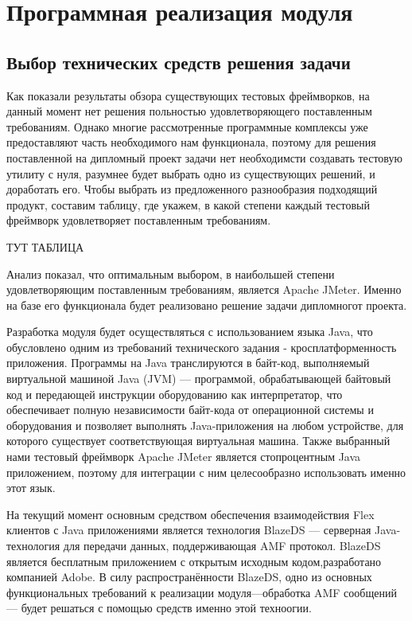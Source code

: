 \chapter{Программная реализация модуля}

\section{Выбор технических средств решения задачи}

 Как показали результаты обзора существующих тестовых фреймворков, на данный момент нет решения польностью
 удовлетворяющего поставленным требованиям. Однако многие рассмотренные программные комплексы уже предоставляют часть
 необходимого нам функционала, поэтому для решения поставленной на дипломный
 проект задачи нет необходимсти создавать тестовую утилиту с нуля, разумнее
 будет выбрать одно из существующих решений, и доработать его.
 Чтобы выбрать из предложенного разнообразия подходящий продукт, составим таблицу, где укажем, в какой степени каждый
  тестовый фреймворк удовлетворяет поставленным требованиям.

  ТУТ ТАБЛИЦА

  Анализ показал, что оптимальным выбором, в наибольшей степени удовлетворяющим поставленным требованиям, является
  Apache JMeter. Именно на базе его функционала будет реализовано решение задачи дипломногот проекта.

  Разработка модуля будет осуществляться с использованием языка Java, что обусловлено одним из требований технического
  задания - кросплатформенность приложения. Программы на Java транслируются в байт-код, выполняемый виртуальной машиной
   Java (JVM) — программой, обрабатывающей байтовый код и передающей инструкции оборудованию как интерпретатор, что
   обеспечивает полную независимости байт-кода от операционной системы и оборудования и позволяет выполнять
   Java-приложения на любом устройстве, для которого существует соответствующая виртуальная машина. Также выбранный нами
   тестовый фреймворк Apache JMeter является стопроцентным Java приложением, поэтому для интеграции с ним целесообразно
   использовать именно этот язык.

На текущий момент основным средством обеспечения взаимодействия Flex клиентов с Java приложениями является технология
BlazeDS --- серверная Java-технология для передачи данных, поддерживающая AMF протокол. BlazeDS является бесплатным
приложением с открытым исходным кодом,разработано компанией Adobe. В силу распространённости BlazeDS, одно из основных
функциональных требований к реализации модуля---обработка AMF сообщений--- будет решаться с помощью средств именно
этой техноогии.

